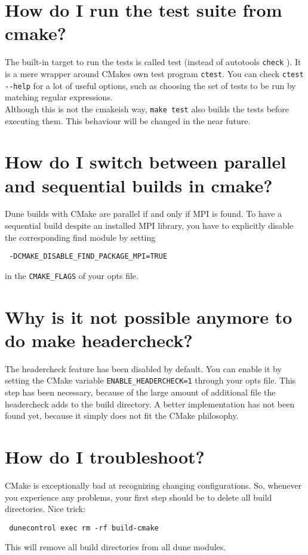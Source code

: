 \documentclass[a4paper,10pt]{scrartcl}
\begin{document}
\section{How do I run the test suite from cmake?}
\label{tests}
The built-in target to run the tests is called test (instead of autotools \lstinline!check! ). It is a mere wrapper around CMakes own test program \lstinline!ctest!. You can check \lstinline!ctest --help! for a lot of useful options, such as choosing the set of tests to be run by matching regular expressions. \\

Although this is not the cmakeish way, \lstinline!make test! also builds the tests before executing them. This behaviour will be changed in the near future.

\section{How do I switch between parallel and sequential builds in cmake?}
\label{parallel}
Dune builds with CMake are parallel if and only if MPI is found. To have a sequential build despite an installed MPI library, you have to explicitly disable the corresponding find module by setting
\begin{lstlisting}
 -DCMAKE_DISABLE_FIND_PACKAGE_MPI=TRUE
\end{lstlisting}
in the \lstinline!CMAKE_FLAGS! of your opts file.

\section{Why is it not possible anymore to do make headercheck?}
\label{headercheck}
The headercheck feature has been disabled by default. You can enable it by setting the CMake variable \lstinline!ENABLE_HEADERCHECK=1! through your opts file. This step has been necessary, because of the large amount of additional file the headercheck adds to the build directory. A better implementation has not been found yet, because it simply does not fit the CMake philosophy.

\section{How do I troubleshoot?}
\label{troubleshoot}
CMake is exceptionally bad at recognizing changing configurations. So, whenever you experience any problems, your first step should be to delete all build directories. Nice trick:
\begin{lstlisting}
 dunecontrol exec rm -rf build-cmake
\end{lstlisting}
This will remove all build directories from all dune modules. \\
\end{document}
